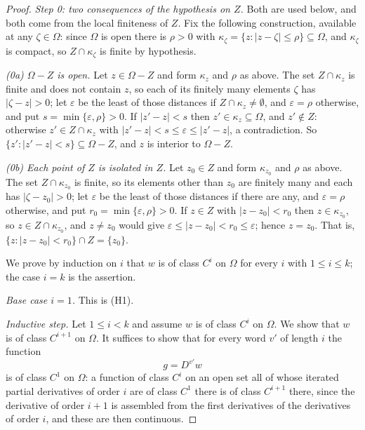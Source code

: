 \begin{proof}
\emph{Step 0: two consequences of the hypothesis on $Z$.}  Both are used below,
and both come from the local finiteness of $Z$.  Fix the following construction,
available at any $\zeta\in\Omega$: since $\Omega$ is open there is $\rho>0$ with
$\kappa_\zeta=\{z:|z-\zeta|\le\rho\}\subseteq\Omega$, and $\kappa_\zeta$ is
compact, so $Z\cap\kappa_\zeta$ is finite by hypothesis.

\emph{(0a) $\Omega-Z$ is open.}  Let $z\in\Omega-Z$ and form $\kappa_z$ and
$\rho$ as above.  The set $Z\cap\kappa_z$ is finite and does not contain $z$,
so each of its finitely many elements $\zeta$ has $|\zeta-z|>0$; let
$\varepsilon$ be the least of those distances if $Z\cap\kappa_z\neq\emptyset$,
and $\varepsilon=\rho$ otherwise, and put $s=\min\{\varepsilon,\rho\}>0$.  If
$|z'-z|<s$ then $z'\in\kappa_z\subseteq\Omega$, and $z'\notin Z$: otherwise
$z'\in Z\cap\kappa_z$ with $|z'-z|<s\le\varepsilon\le|z'-z|$, a contradiction.
So $\{z':|z'-z|<s\}\subseteq\Omega-Z$, and $z$ is interior to $\Omega-Z$.

\emph{(0b) Each point of $Z$ is isolated in $Z$.}  Let $z_0\in Z$ and form
$\kappa_{z_0}$ and $\rho$ as above.  The set $Z\cap\kappa_{z_0}$ is finite, so
its elements other than $z_0$ are finitely many and each has $|\zeta-z_0|>0$;
let $\varepsilon$ be the least of those distances if there are any, and
$\varepsilon=\rho$ otherwise, and put $r_0=\min\{\varepsilon,\rho\}>0$.  If
$z\in Z$ with $|z-z_0|<r_0$ then $z\in\kappa_{z_0}$, so $z\in Z\cap\kappa_{z_0}$,
and $z\neq z_0$ would give $\varepsilon\le|z-z_0|<r_0\le\varepsilon$; hence
$z=z_0$.  That is, $\{z:|z-z_0|<r_0\}\cap Z=\{z_0\}$.

We prove by induction on $i$ that $w$ is of class $C^{i}$ on $\Omega$ for every
$i$ with $1\le i\le k$; the case $i=k$ is the assertion.

\emph{Base case $i=1$.}  This is (H1).

\emph{Inductive step.}  Let $1\le i<k$ and assume $w$ is of class $C^{i}$ on
$\Omega$.  We show that $w$ is of class $C^{i+1}$ on $\Omega$.  It suffices to
show that for every word $v'$ of length $i$ the function
\[
  g=D^{v'}w
\]
is of class $C^{1}$ on $\Omega$: a function of class $C^{i}$ on an open set all
of whose iterated partial derivatives of order $i$ are of class $C^{1}$ there
is of class $C^{i+1}$ there, since the derivative of order $i+1$ is assembled
from the first derivatives of the derivatives of order $i$, and these are then
continuous.


\end{proof}
